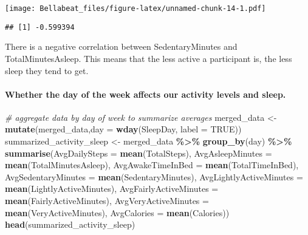 \documentclass[
]{article}
\newenvironment{Shaded}{\begin{snugshade}}{\end{snugshade}}
\newcommand{\AttributeTok}[1]{\textcolor[rgb]{0.13,0.29,0.53}{#1}}
\newcommand{\CommentTok}[1]{\textcolor[rgb]{0.56,0.35,0.01}{\textit{#1}}}
\newcommand{\ConstantTok}[1]{\textcolor[rgb]{0.56,0.35,0.01}{#1}}
\newcommand{\FunctionTok}[1]{\textcolor[rgb]{0.13,0.29,0.53}{\textbf{#1}}}
\newcommand{\NormalTok}[1]{#1}
\newcommand{\OtherTok}[1]{\textcolor[rgb]{0.56,0.35,0.01}{#1}}
\newcommand{\SpecialCharTok}[1]{\textcolor[rgb]{0.81,0.36,0.00}{\textbf{#1}}}
\begin{document}
\texttt{[image: Bellabeat\_files/figure-latex/unnamed-chunk-14-1.pdf]}

\begin{Shaded}
\end{Shaded}

\begin{verbatim}
## [1] -0.599394
\end{verbatim}

There is a negative correlation between SedentaryMinutes and
TotalMinutesAsleep. This means that the less active a participant is,
the less sleep they tend to get.

\hypertarget{whether-the-day-of-the-week-affects-our-activity-levels-and-sleep.}{%
\paragraph{Whether the day of the week affects our activity levels and
sleep.}\label{whether-the-day-of-the-week-affects-our-activity-levels-and-sleep.}}

\begin{Shaded}
\begin{Highlighting}[]
\CommentTok{\# aggregate data by day of week to summarize averages }
\NormalTok{merged\_data }\OtherTok{\textless{}{-}} \FunctionTok{mutate}\NormalTok{(merged\_data,}\AttributeTok{day =} \FunctionTok{wday}\NormalTok{(SleepDay, }\AttributeTok{label =} \ConstantTok{TRUE}\NormalTok{))}
\NormalTok{summarized\_activity\_sleep }\OtherTok{\textless{}{-}}\NormalTok{ merged\_data }\SpecialCharTok{\%\textgreater{}\%} 
  \FunctionTok{group\_by}\NormalTok{(day) }\SpecialCharTok{\%\textgreater{}\%} 
  \FunctionTok{summarise}\NormalTok{(}\AttributeTok{AvgDailySteps =} \FunctionTok{mean}\NormalTok{(TotalSteps),}
            \AttributeTok{AvgAsleepMinutes =} \FunctionTok{mean}\NormalTok{(TotalMinutesAsleep),}
            \AttributeTok{AvgAwakeTimeInBed =} \FunctionTok{mean}\NormalTok{(TotalTimeInBed), }
            \AttributeTok{AvgSedentaryMinutes =} \FunctionTok{mean}\NormalTok{(SedentaryMinutes),}
            \AttributeTok{AvgLightlyActiveMinutes =} \FunctionTok{mean}\NormalTok{(LightlyActiveMinutes),}
            \AttributeTok{AvgFairlyActiveMinutes =} \FunctionTok{mean}\NormalTok{(FairlyActiveMinutes),}
            \AttributeTok{AvgVeryActiveMinutes =} \FunctionTok{mean}\NormalTok{(VeryActiveMinutes), }
            \AttributeTok{AvgCalories =} \FunctionTok{mean}\NormalTok{(Calories))}
\FunctionTok{head}\NormalTok{(summarized\_activity\_sleep)}
\end{Highlighting}
\end{Shaded}
\end{document}
